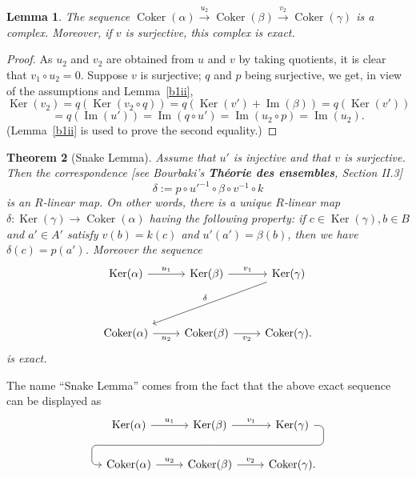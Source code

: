 \documentclass[12pt,letterpaper]{article}%
\newcommand{\oo}{\operatorname}\newcommand{\ooo}{\operatorname*}
\newcommand{\Ker}{\operatorname{Ker}}\newcommand{\Coker}{\operatorname{Coker}}
\newcommand{\xr}{\xrightarrow}
\newtheorem{thm}{Theorem}%
\newtheorem{lem}[thm]{Lemma}
\begin{document}
\begin{lem}\label{b2ii}
The sequence $\oo{Coker}(\alpha)\xr{u_2}\oo{Coker}(\beta)\xr{v_2}\oo{Coker}(\gamma)$ is a complex. Moreover, if $v$ is surjective, this complex is exact.
\end{lem}

\begin{proof}
As $u_2$ and $v_2$ are obtained from $u$ and $v$ by taking quotients, it is clear that $v_1\circ u_2=0$. Suppose $v$ is surjective; $q$ and $p$ being surjective, we get, in view of the assumptions and Lemma~\ref{b1ii},
$$
\oo{Ker}(v_2) = q(\oo{Ker}(v_2\circ q))= q(\oo{Ker}(v')+\oo{Im}(\beta))=q(\oo{Ker}(v'))
$$ 
$$
=q(\oo{Im}(u'))=\oo{Im}(q\circ u')=\oo{Im}(u_2\circ p)=\oo{Im}(u_2).
$$ 
(Lemma~\ref{b1ii} is used to prove the second equality.)
\end{proof} 

\begin{thm}[Snake Lemma]\label{lsl}
Assume that $u'$ is injective and that $v$ is surjective. Then the correspondence [see Bourbaki's \textbf{Théorie des ensembles}, Section II.3] 
$$
\delta:=p\circ u'^{-1}\circ\beta\circ v^{-1}\circ k
$$ 
is an $R$-linear map. On other words, there is a unique $R$-linear map $\delta:\oo{Ker}(\gamma)\to\oo{Coker}(\alpha)$ having the following property: if $c\in\oo{Ker}(\gamma),b\in B$ and $a'\in A'$ satisfy $v(b)=k(c)$ and $u'(a')= \beta(b)$, then we have $\delta(c)=p(a')$. Moreover the sequence 
$$
\begin{tikzcd}
\Ker(\alpha)\ar["u_1"]{r}&\Ker(\beta)\ar["v_1"]{r}&\Ker(\gamma)\ar["\delta"']{ddll}\\ \\ 
\Coker(\alpha)\ar["u_2"']{r}&\Coker(\beta)\ar["v_2"']{r}&\Coker(\gamma).
\end{tikzcd}
$$ 
is exact.
\end{thm}

The name ``Snake Lemma'' comes from the fact that the above exact sequence can be displayed as 
$$%
\begin{tikzcd}
  \Ker(\alpha) \ar["u_1"]{r} & \Ker(\beta) \ar["v_1"]{r}
             \ar[draw=none]{d}[name=X, anchor=center]{}
    & \Ker(\gamma) \ar[rounded corners,
            to path={ -- ([xshift=2ex]\tikztostart.east)
                      |- (X.center) \tikztonodes
                      -| ([xshift=-2ex]\tikztotarget.west)
                      -- (\tikztotarget)}]{dll}[at end]{} \\      
  \Coker(\alpha) \ar["u_2"]{r} & \Coker(\beta) \ar["v_2"]{r} & \Coker(\gamma).
\end{tikzcd}
$$
\end{document}
